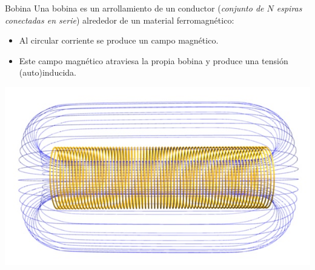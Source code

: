 \documentclass[xcolor={usenames,svgnames,dvipsnames}]{beamer}
\begin{document}
\begin{frame}[label={sec:orgb792fc2}]{Bobina}
Una bobina es un arrollamiento de un conductor (\emph{conjunto de \(N\) espiras conectadas en serie}) alrededor de un material ferromagnético:
\begin{itemize}
\item Al circular corriente se produce un campo magnético.
\item Este campo magnético atraviesa la propia bobina y produce una tensión (auto)inducida.
\end{itemize}
\begin{center}
\includegraphics[height=0.5\textheight]{figs/Solenoide.jpg}
\end{center}
\end{frame}
\end{document}
